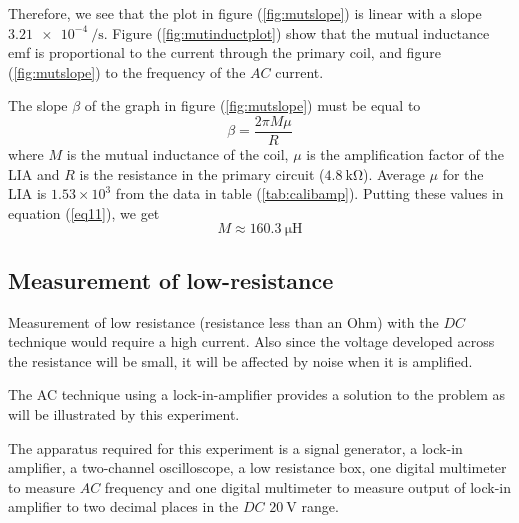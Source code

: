 \documentclass[%
 reprint,
nofootinbib,
 amsmath,amssymb,
 aps,
]{revtex4-2}
\begin{document}
            Therefore, we see that the plot in figure (\ref{fig:mutslope}) is linear with a slope $\SI{3.21e-4}{\per \second}$. Figure (\ref{fig:mutinductplot}) show that the mutual inductance emf is proportional to the current through the primary coil, and figure (\ref{fig:mutslope}) to the frequency of the $AC$ current.
            \par
            The slope $\beta$ of the graph in figure (\ref{fig:mutslope}) must be equal to
            \begin{equation}
            \label{eq11}
                \beta = \dfrac{2 \pi M \mu}{R}
            \end{equation}
            where $M$ is the mutual inductance of the coil, $\mu$ is the amplification factor of the LIA and $R$ is the resistance in the primary circuit ($\SI{4.8}{\kilo \ohm}$). Average $\mu$ for the LIA is $1.53 \times 10^3$ from the data in table (\ref{tab:calibamp}). Putting these values in equation (\ref{eq11}), we get
            \begin{equation}
                \boxed{M \approx \SI{160.3}{\micro \henry}}
            \end{equation}
    \subsection{Measurement of low-resistance}
        Measurement of low resistance (resistance less than an Ohm) with the $DC$ technique would require a high current. Also since the voltage developed across the resistance will be small, it will be affected by noise when it is amplified.
        \par
        The AC technique using a lock-in-amplifier provides a solution to the problem as will be illustrated by this experiment.
        \par
        The apparatus required for this experiment is a signal generator, a lock-in amplifier, a two-channel oscilloscope, a low resistance box, one digital multimeter to measure $AC$ frequency and one digital multimeter to measure output of lock-in amplifier to two decimal places in the $DC$ $\SI{20}{\volt}$ range. 
\end{document}
